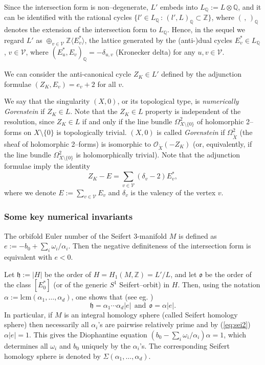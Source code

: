 \documentclass[oneside]{amsart}
\numberwithin{equation}{section}
\numberwithin{equation}{subsection}
\theoremstyle{plain}
\theoremstyle{definition}
\newcommand{\tX}{\widetilde{X}}
\def\Q{\mathbb Q}
\def\Z{\mathbb Z}
\newcommand{\calv}{{\mathcal V}}
\newcommand{\calO}{{\mathcal O}}\newcommand{\calU}{{\mathcal U}}
\newcommand{\V}{\calv}\newcommand{\Nd}
\renewcommand{\Z}{\mathbb{Z}}
\renewcommand{\Q}{\mathbb{Q}}
\begin{document}
Since the intersection form is non--degenerate, $L'$ embeds into $ L_{{\mathbb Q}}:=L\otimes {\mathbb Q}$,
and it can be identified with the rational cycles $\{l'\in L_{{\mathbb Q}}\,:\, (l',L)_{{\mathbb Q}}\subset \Z\}$, where $(\,,\,)_{{\mathbb Q}}$ denotes the extension of the intersection form to $L_{{\mathbb Q}}$.
 Hence, in the sequel we regard $L'$ as $\oplus_{v\in \V} \Z\langle E^*_v \rangle$, the lattice generated by the (anti-)dual cycles $E^*_v\in L_{{\Q}}$, $v\in \V$, where $(E_u^*,E_v)_{{\Q}}=-\delta_{u,v}$ (Kronecker delta) for any $u,v\in \calv$.

We can consider the anti-canonical cycle $Z_K\in L'$ defined by the adjunction formulae $(Z_K,E_v)=e_v+2$ for all $v$. 

We say that the singularity $(X,0)$, or its topological type, is \emph{numerically Gorenstein} if $Z_K\in L$. Note that the $Z_K\in L$ property is independent of the resolution, 
since $Z_K\in L$ if and only if the line bundle $\Omega^2_{X\setminus \{0\}}$ of holomorphic 2--forms
on $X\setminus \{0\}$ is topologically trivial. $(X,0)$ is called \emph{Gorenstein} if 
$\Omega^2_{\tX}$ (the sheaf of holomorphic 2--forms) is isomorphic to $ \calO_{\tX}(-Z_K)$ (or,
equivalently, if the line bundle $\Omega^2_{X\setminus \{0\}}$ is holomorphically trivial).
Note that the adjunction formulae imply the identity 
 \begin{equation}\label{ZK}
 Z_K-E=\sum_{v\in\mathcal{V}}(\delta_v-2)E^*_v,
 \end{equation}
where we denote $E:=\sum_{v\in\mathcal{V}}E_v$ and $\delta_v$ is the valency of the vertex $v$.

\subsubsection{\bf Some key numerical invariants}
The orbifold Euler number of the Seifert 3-manifold $M$ is defined as $e:=-b_0+\sum_i\omega_i/\alpha_i$. Then the negative definiteness of the intersection form is equivalent with  $e<0$. 

Let $\mathfrak{h}:=|H|$ be the order of $H=H_1(M,\mathbb{Z})=L'/L$, and
let  $\mathfrak{o}$ be the order of the class $[E^*_0]$ (or of
the generic $S^1$ Seifert--orbit) in $H$. 
Then,  using the notation  $\alpha:=\mathrm{lcm}(\alpha_1,\ldots,\alpha_d)$, one shows that (see eg. \cite{neumann.abel})
\begin{equation}\label{eq:sei2}
 \mathfrak{h}=\alpha_1\cdots\alpha_d|e| \ \ \mbox{and} \ \ \mathfrak{o}=\alpha|e|.
\end{equation}
In particular, if $M$ is an integral homology sphere (called Seifert homology sphere) then necessarily
all $\alpha_i$'s are pairwise relatively prime and by (\ref{eq:sei2}) $\alpha |e|=1$. 
This gives the Diophantine equation $(b_0-\sum_i\omega_i/\alpha_i)\alpha=1$, which determines all $\omega_i$ and $b_0$
 uniquely by the $\alpha_i$'s. The corresponding Seifert homology sphere is denoted by $\Sigma(\alpha_1,\dots,\alpha_d)$.
\end{document}
